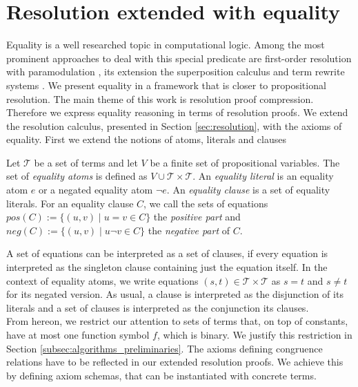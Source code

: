\section*{Resolution extended with equality}

Equality is a well researched topic in computational logic.
Among the most prominent approaches to deal with this special predicate are first-order resolution with paramodulation \cite{Robinson1969}, its extension the superposition calculus \cite{Nieuwenhuis2001} and term rewrite systems \cite{Baader1998}.
We present equality in a framework that is closer to propositional resolution.
The main theme of this work is resolution proof compression.
Therefore we express equality reasoning in terms of resolution proofs.
We extend the resolution calculus, presented in Section \ref{sec:resolution}, with the axioms of equality.
First we extend the notions of atoms, literals and clauses

\begin{definition}

Let $\mathcal{T}$ be a set of terms and let $V$ be a finite set of propositional variables.
The set of \emph{equality atoms} is defined as $V \cup \mathcal{T} \times \mathcal{T}$.
An \emph{equality literal} is an equality atom $e$ or a negated equality atom $\neg e$.
An \emph{equality clause} is a set of equality literals.
For an equality clause $C$, we call the sets of equations $pos(C) := \{(u,v) \mid u = v \in C\}$ the \emph{positive part} and $neg(C) := \{(u,v) \mid u \neg v \in C\}$ the \emph{negative part} of $C$.

\end{definition}

A set of equations can be interpreted as a set of clauses, if every equation is interpreted as the singleton clause containing just the equation itself.
In the context of equality atoms, we write equations $(s,t) \in \mathcal{T} \times \mathcal{T}$ as $s = t$ and $s \neq t$ for its negated version.
As usual, a clause is interpreted as the disjunction of its literals and a set of clauses is interpreted as the conjunction its clauses.\\

From hereon, we restrict our attention to sets of terms that, on top of constants, have at most one function symbol $f$, which is binary.
We justify this restriction in Section \ref{subsec:algorithms_preliminaries}.
The axioms defining congruence relations have to be reflected in our extended resolution proofs.
We achieve this by defining axiom schemas, that can be instantiated with concrete terms.

